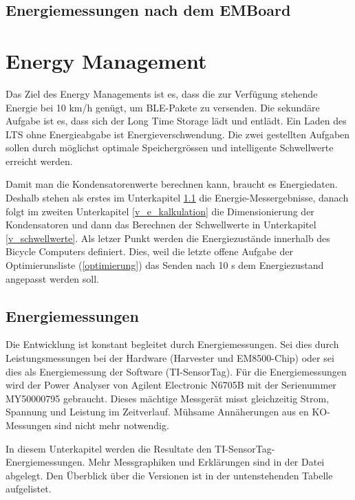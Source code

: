 \subsection{Energiemessungen nach dem EMBoard}



\section{Energy Management}

Das Ziel des Energy Managements ist es, dass die zur Verfügung stehende Energie bei 10 km/h genügt, um BLE-Pakete zu versenden. Die sekundäre Aufgabe ist es, dass sich der Long Time Storage lädt und entlädt. Ein Laden des LTS ohne Energieabgabe ist Energieverschwendung. Die zwei gestellten Aufgaben sollen durch möglichst optimale Speichergrössen und intelligente Schwellwerte erreicht werden.

Damit man die Kondensatorenwerte berechnen kann, braucht es Energiedaten. Deshalb stehen als erstes im Unterkapitel \ref{v_messungen_sensortag} die Energie-Messergebnisse, danach folgt im zweiten Unterkapitel \ref{v_e_kalkulation} die Dimensionierung der Kondensatoren und dann das Berechnen der Schwellwerte in Unterkapitel \ref{v_schwellwerte}. Als letzer Punkt werden die Energiezustände innerhalb des Bicycle Computers definiert. Dies, weil die letzte offene Aufgabe der Optimierunsliste (\ref{optimierung}) das Senden nach 10 s dem Energiezustand angepasst werden soll.


\subsection{Energiemessungen}
\label{v_messungen_sensortag}


Die Entwicklung ist konstant begleitet durch Energiemessungen. Sei dies durch Leistungsmessungen bei der Hardware (Harvester und EM8500-Chip) oder sei dies als Energiemessung der Software (TI-SensorTag). Für die Energiemessungen wird der Power Analyser von Agilent Electronic N6705B mit der Serienummer MY50000795 gebraucht. Dieses mächtige Messgerät misst gleichzeitig Strom, Spannung und Leistung im Zeitverlauf. Mühsame Annäherungen aus en KO-Messungen sind nicht mehr notwendig.

In diesem Unterkapitel werden die Resultate den TI-SensorTag-Energiemessungen. Mehr Messgraphiken und Erklärungen sind in der Datei  abgelegt. Den Überblick über die Versionen ist in der untenstehenden Tabelle aufgelistet. 


